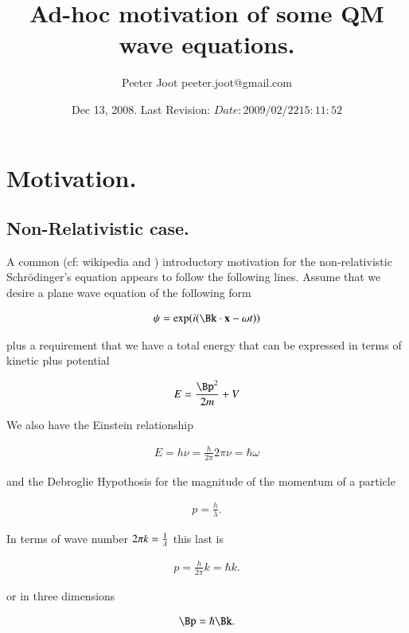 \documentclass{article}
\title{ Ad-hoc motivation of some QM wave equations. }
\author{Peeter Joot \quad peeter.joot@gmail.com}
\date{ Dec 13, 2008.  Last Revision: $Date: 2009/02/22 15:11:52 $ }
\begin{document}
\maketitle{}

\tableofcontents

\section{ Motivation. }

\subsection{ Non-Relativistic case. }

A common (cf: wikipedia and \cite{french1998iqp}) introductory motivation for the non-relativistic Schr\"{o}dinger's equation appears to follow the following lines.  Assume that
we desire a plane wave equation of the following form

\begin{align*}
\psi = \exp(i (\Bk \cdot \Bx - \omega t))
\end{align*}

plus a requirement that we have a total energy that can be expressed in terms of kinetic plus potential

\begin{align}\label{eqn:energy}
E = \frac{\Bp^2}{2m} + V
\end{align}

We also have the Einstein relationship

\begin{align}
E = h \nu = \frac{h}{2\pi} 2 \pi \nu = \hbar \omega
\end{align}

and the Debroglie Hypothosis for the magnitude of the momentum of a particle

\begin{align*}
p = \frac{h}{\lambda}.
\end{align*}

In terms of wave number $2 \pi k = \frac{1}{\lambda}$ this last is

\begin{align*}
p = \frac{h}{2\pi} k = \hbar k.
\end{align*}

or in three dimensions

\begin{align*}
\Bp = \hbar \Bk.
\end{align*}
\end{document}
